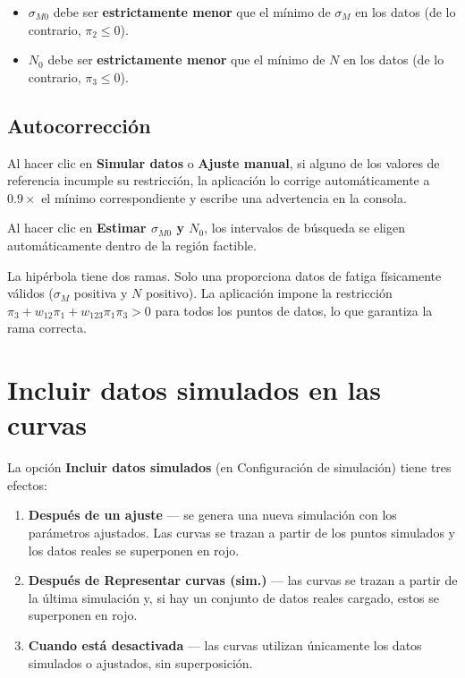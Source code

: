 \documentclass[11pt,a4paper]{article}
\newcommand{\piz}{\ensuremath{\pi_3}}
\newcommand{\pit}{\ensuremath{\pi_2}}
\newcommand{\pio}{\ensuremath{\pi_1}}
\newcommand{\sM}{\ensuremath{\sigma_M}}
\newcommand{\sMzero}{\ensuremath{\sigma_{M0}}}
\newcommand{\Nzero}{\ensuremath{N_0}}
\begin{document}
\begin{itemize}[leftmargin=1.4em]
  \item $\sMzero$ debe ser \textbf{estrictamente menor} que el mínimo de $\sM$ en los datos (de lo contrario, $\pit \le 0$).
  \item $\Nzero$ debe ser \textbf{estrictamente menor} que el mínimo de $N$ en los datos (de lo contrario, $\piz \le 0$).
\end{itemize}

\subsection{Autocorrección}

Al hacer clic en \textbf{Simular datos} o \textbf{Ajuste manual}, si alguno de los valores de referencia incumple su restricción, la aplicación lo corrige automáticamente a $0.9\times$ el mínimo correspondiente y escribe una advertencia en la consola.

Al hacer clic en \textbf{Estimar $\sMzero$ y $\Nzero$}, los intervalos de búsqueda se eligen automáticamente dentro de la región factible.

\begin{notebox}
La hipérbola tiene dos ramas. Solo una proporciona datos de fatiga físicamente válidos ($\sM$ positiva y $N$ positivo). La aplicación impone la restricción $\piz + w_{12}\pio + w_{123}\pio\piz > 0$ para todos los puntos de datos, lo que garantiza la rama correcta.
\end{notebox}

\section{Incluir datos simulados en las curvas}
\label{sec:include-sim}

La opción \textbf{Incluir datos simulados} (en Configuración de simulación) tiene tres efectos:

\begin{enumerate}[leftmargin=1.4em]
  \item \textbf{Después de un ajuste} --- se genera una nueva simulación con los parámetros ajustados. Las curvas se trazan a partir de los puntos simulados y los datos reales se superponen en rojo.
  \item \textbf{Después de Representar curvas (sim.)} --- las curvas se trazan a partir de la última simulación y, si hay un conjunto de datos reales cargado, estos se superponen en rojo.
  \item \textbf{Cuando está desactivada} --- las curvas utilizan únicamente los datos simulados o ajustados, sin superposición.
\end{enumerate}
\end{document}

